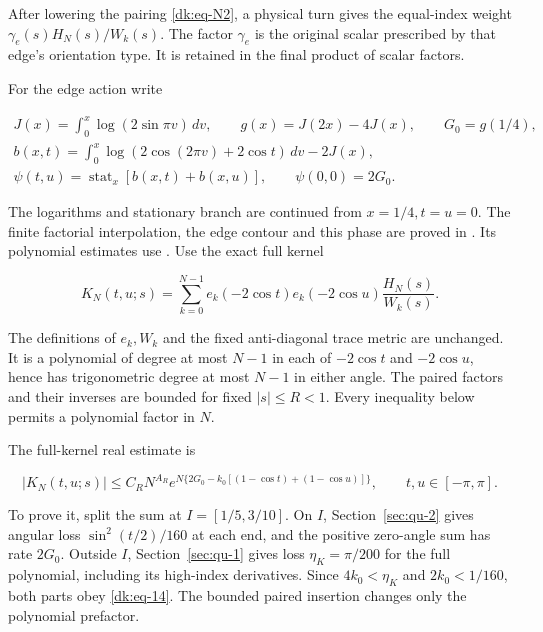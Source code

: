 After lowering the pairing \eqref{dk:eq-N2}, a physical turn gives the equal-index
weight \(\gamma_e(s)H_N(s)/W_k(s)\). The factor \(\gamma_e\) is the
original scalar prescribed by that edge's orientation type. It is
retained in the final product of scalar factors.

For the edge action write

\begin{equation}\label{dk:eq-N4}
\begin{gathered}
 J(x)=\int_0^x\log(2\sin\pi v)\,dv,\qquad
 g(x)=J(2x)-4J(x),\qquad G_0=g(1/4),\\
 b(x,t)=\int_0^x\log(2\cos(2\pi v)+2\cos t)\,dv-2J(x),\\
 \psi(t,u)=\operatorname{stat}_x[b(x,t)+b(x,u)],
                       \qquad\psi(0,0)=2G_0.
 \end{gathered}
\end{equation}

The logarithms and stationary branch are continued from
\(x=1/4,t=u=0\). The finite factorial interpolation, the edge
contour and this phase are proved in
\cite[Section~3]{CircleTreeVolume}.
Its polynomial estimates use
\cite[Lemma~2.1]{CircleTreeVolume}.
Use the exact full kernel

\begin{equation}\label{dk:eq-13}
K_N(t,u;s)=\sum_{k=0}^{N-1}
       e_k(-2\cos t)e_k(-2\cos u)\frac{H_N(s)}{W_k(s)}.
\end{equation}

The definitions of \(e_k,W_k\) and the fixed anti-diagonal trace metric are
unchanged. It is a polynomial of degree at most \(N-1\) in each of
\(-2\cos t\) and \(-2\cos u\), hence has trigonometric degree at most
\(N-1\) in either angle.
The paired factors and their inverses are bounded for fixed \(|s|\le R<1\).
Every inequality below permits a polynomial factor in $N$.

The full-kernel real estimate is

\begin{equation}\label{dk:eq-14}
|K_N(t,u;s)|\le C_RN^{A_R}
   e^{N\{2G_0-k_0[(1-\cos t)+(1-\cos u)]\}},
                 \qquad t,u\in[-\pi,\pi].
\end{equation}

To prove it, split the sum at \(I=[1/5,3/10]\). On \(I\),
Section~\ref{sec:qu-2} gives angular loss \(\sin^2(t/2)/160\)
at each end, and the positive zero-angle sum has rate \(2G_0\).
Outside \(I\), Section~\ref{sec:qu-1} gives loss
\(\eta_K=\pi/200\) for the full polynomial, including its
high-index derivatives. Since \(4k_0<\eta_K\) and
\(2k_0<1/160\), both parts obey \eqref{dk:eq-14}.
The bounded paired insertion changes only the polynomial prefactor.

